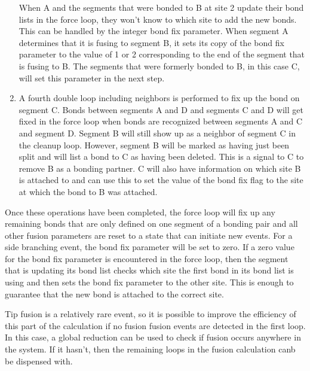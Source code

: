 \documentclass[12pt]{article}
\begin{document}
\begin{enumerate}
When A and the
segments that were bonded to B at site 2 update their bond lists in the force loop, they
won't know to which site to add the new bonds. This can be handled by the integer bond fix
parameter. When segment A determines that it is fusing to segment B, it sets its copy of the
bond fix parameter to the value of 1 or 2 corresponding to the end of the segment that is
fusing to B. The segments that were formerly bonded to B, in this case C, will set this
parameter in the next step.

\item A fourth double loop including neighbors is performed to fix up the bond on segment C.
Bonds between segments A and D and segments C and D will get fixed in the force loop when
bonds are recognized between segments A and C and segment D. Segment B will still show up as
a neighbor of
segment C in the cleanup loop. However, segment B will be marked as having just been split and
will list a
bond to C as having been deleted. This is a signal to C to remove B as a bonding partner. C
will also have information on which site B is attached to and can use this to set the value of
the bond fix flag to the site at which the bond to B was attached.
\end{enumerate}
Once these operations have been completed, the force loop will fix up any remaining
bonds that are only defined on one segment of a bonding pair and all other fusion parameters are
reset to a state that can initiate new events. For a side branching event, the bond fix parameter
will be set to zero. If a zero value for the bond fix parameter is encountered in the force loop,
then the segment that is
updating its bond list checks which site the first bond in its bond list is using and then sets
the bond fix parameter to the other site. This is enough to guarantee that the new bond is
attached to the correct site.

Tip fusion is a relatively rare event, so it is possible to improve the
efficiency of this part of the calculation if no fusion fusion events are
detected in the first loop. In this case, a global reduction can be used to
check if fusion occurs anywhere in the system. If it hasn't, then the remaining
loops in the fusion calculation canb be dispensed with.
\end{document}

